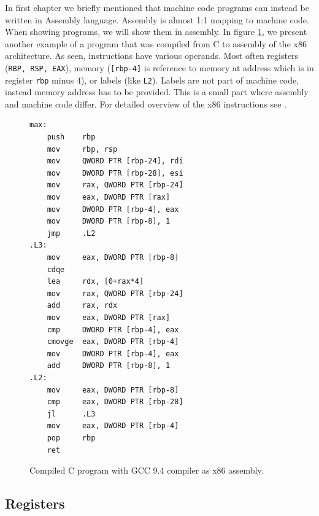 In first chapter we briefly mentioned that machine code programs can instead be
written in Assembly language. Assembly is almost 1:1 mapping to machine code.
When showing programs, we will show them in assembly. In figure
\ref{fig:assembly-example2}, we present another example of a program that was
compiled from C to assembly of the x86 architecture. As seen, instructions have
various operands. Most often registers (\texttt{RBP, RSP, EAX}), memory
(\texttt{[rbp-4]} is reference to memory at address which is in register
\texttt{rbp} minus $4$), or labels (like \texttt{L2}). Labels are not part of
machine code, instead memory address has to be provided. This is a small part
where assembly and machine code differ. For detailed overview of the x86
instructions see \cite{intel-manual}.

\begin{figure}\label{fig:assembly-example2}
    \begin{lstlisting}
max:
    push    rbp
    mov     rbp, rsp
    mov     QWORD PTR [rbp-24], rdi
    mov     DWORD PTR [rbp-28], esi
    mov     rax, QWORD PTR [rbp-24]
    mov     eax, DWORD PTR [rax]
    mov     DWORD PTR [rbp-4], eax
    mov     DWORD PTR [rbp-8], 1
    jmp     .L2
.L3:
    mov     eax, DWORD PTR [rbp-8]
    cdqe
    lea     rdx, [0+rax*4]
    mov     rax, QWORD PTR [rbp-24]
    add     rax, rdx
    mov     eax, DWORD PTR [rax]
    cmp     DWORD PTR [rbp-4], eax
    cmovge  eax, DWORD PTR [rbp-4]
    mov     DWORD PTR [rbp-4], eax
    add     DWORD PTR [rbp-8], 1
.L2:
    mov     eax, DWORD PTR [rbp-8]
    cmp     eax, DWORD PTR [rbp-28]
    jl      .L3
    mov     eax, DWORD PTR [rbp-4]
    pop     rbp
    ret
    \end{lstlisting}
    \caption{Compiled C program with GCC 9.4 compiler as x86 assembly.}
\end{figure}

\subsection{Registers}

